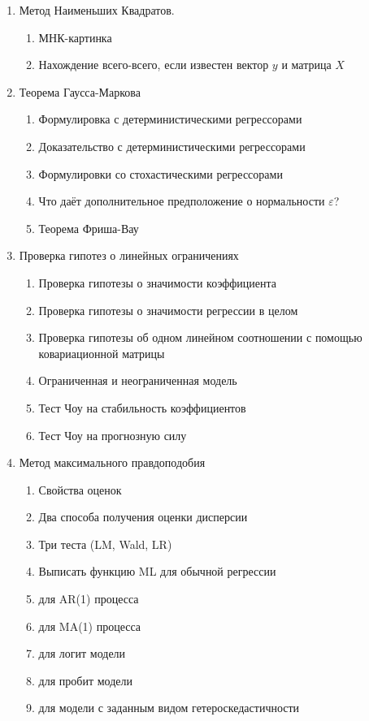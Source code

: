 \documentclass[12pt, a4paper]{article}\usepackage[]{graphicx}\usepackage[]{color}
\begin{document}
\begin{enumerate}

\item Метод Наименьших Квадратов.

\begin{enumerate}
\item МНК-картинка
\item Нахождение всего-всего, если известен вектор $y$ и матрица $X$
  \end{enumerate}

\item Теорема Гаусса-Маркова
\begin{enumerate}
\item Формулировка с детерминистическими регрессорами
\item Доказательство с детерминистическими регрессорами
\item Формулировки со стохастическими регрессорами
\item Что даёт дополнительное предположение о нормальности $\varepsilon$?
\item Теорема Фриша-Вау
\end{enumerate}

\item Проверка гипотез о линейных ограничениях
\begin{enumerate}
\item Проверка гипотезы о значимости коэффициента
\item Проверка гипотезы о значимости регрессии в целом
\item Проверка гипотезы об одном линейном соотношении с помощью ковариационной матрицы
\item Ограниченная и неограниченная модель
\item Тест Чоу на стабильность коэффициентов
\item Тест Чоу на прогнозную силу
\end{enumerate}

\item Метод максимального правдоподобия

\begin{enumerate}
\item Свойства оценок
\item Два способа получения оценки дисперсии
\item Три теста (LM, Wald, LR)
\item Выписать функцию ML для обычной регрессии
\item для AR(1) процесса
\item для MA(1) процесса
\item для логит модели
\item для пробит модели
\item для модели с заданным видом гетероскедастичности
\end{enumerate}


\end{enumerate}
\end{document}
